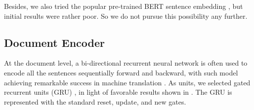 Besides, we also tried the popular pre-trained BERT sentence embedding \cite{bert}, but initial results were rather poor. So we do not pursue this possibility any further. 

\subsection{Document Encoder}
At the document level, a bi-directional recurrent neural network \cite{bi-rnn} is often used to encode all the sentences sequentially forward and backward, with such model achieving remarkable success in machine translation \cite{bi-rnn_mt}. As units, we selected gated recurrent units (GRU) \cite{GRU_propose}, in light of favorable results shown in \cite{GRU_why}.  The GRU is represented 
with the  standard  reset, update, and new gates.

